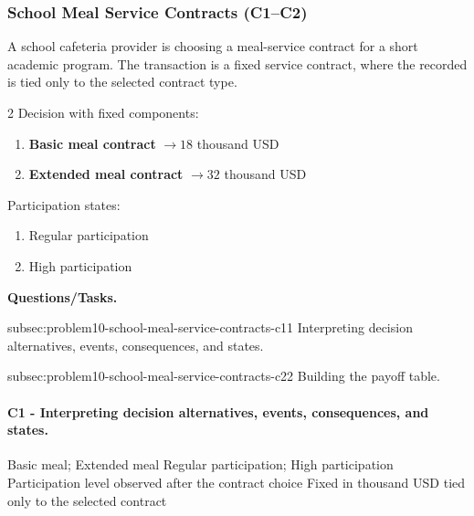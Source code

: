 	\subsubsection{School Meal Service Contracts (C1--C2)}
	\label{sec:problem10-school-meal-service-contracts-c1-c2}
	A school cafeteria provider is choosing a meal-service contract for a short academic program. The transaction is a fixed service contract, where the recorded  is tied only to the selected contract type.

	\begin{multicols}{2}
		Decision  with fixed  components:
		\begin{enumerate}[label=\arabic*.]
			\item \textbf{Basic meal contract} $\to 18$ thousand USD
			\item \textbf{Extended meal contract} $\to 32$ thousand USD
		\end{enumerate}

			\columnbreak

		Participation states:
		\begin{enumerate}[label=\arabic*.]
			\item Regular participation
			\item High participation
		\end{enumerate}
	\end{multicols}

	\textbf{Questions/Tasks.}
	\begin{enumerate}
		\CriterionTask
		{subsec:problem10-school-meal-service-contracts-c1}{1}
		{Interpreting decision alternatives, events, consequences, and states.}

		\CriterionTask
		{subsec:problem10-school-meal-service-contracts-c2}{2}
		{Building the payoff table.}
	\end{enumerate}

	\paragraph*{C1 - Interpreting decision alternatives, events, consequences, and states.}
	\label{subsec:problem10-school-meal-service-contracts-c1}
	\DecisionElementsTable
	{Basic meal; Extended meal}
	{Regular participation; High participation}
	{Participation level observed after the contract choice}
	{Fixed  in thousand USD tied only to the selected contract}

